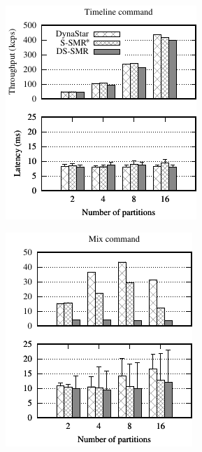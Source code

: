 \begin{figure}[ht!]
  \centering
  \begin{subfigure}{.4\textwidth}
    \includegraphics[width=.9\textwidth]{figures/experiments/dynastar/chirper-compare-timeline}
    \caption{}
  \end{subfigure}
  \begin{subfigure}{.4\textwidth}
    \includegraphics[width=.9\textwidth]{figures/experiments/dynastar/chirper-compare-mix}

\end{subfigure}
\end{figure}
